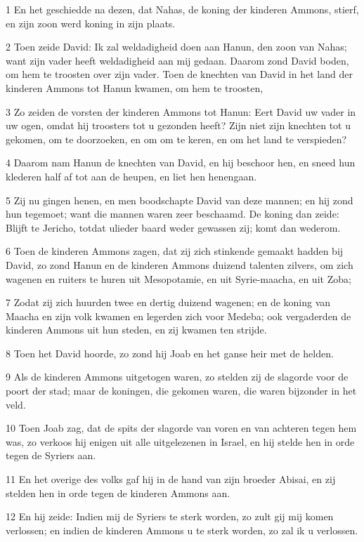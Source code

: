 \par 1 En het geschiedde na dezen, dat Nahas, de koning der kinderen Ammons, stierf, en zijn zoon werd koning in zijn plaats.
\par 2 Toen zeide David: Ik zal weldadigheid doen aan Hanun, den zoon van Nahas; want zijn vader heeft weldadigheid aan mij gedaan. Daarom zond David boden, om hem te troosten over zijn vader. Toen de knechten van David in het land der kinderen Ammons tot Hanun kwamen, om hem te troosten,
\par 3 Zo zeiden de vorsten der kinderen Ammons tot Hanun: Eert David uw vader in uw ogen, omdat hij troosters tot u gezonden heeft? Zijn niet zijn knechten tot u gekomen, om te doorzoeken, en om om te keren, en om het land te verspieden?
\par 4 Daarom nam Hanun de knechten van David, en hij beschoor hen, en sneed hun klederen half af tot aan de heupen, en liet hen henengaan.
\par 5 Zij nu gingen henen, en men boodschapte David van deze mannen; en hij zond hun tegemoet; want die mannen waren zeer beschaamd. De koning dan zeide: Blijft te Jericho, totdat ulieder baard weder gewassen zij; komt dan wederom.
\par 6 Toen de kinderen Ammons zagen, dat zij zich stinkende gemaakt hadden bij David, zo zond Hanun en de kinderen Ammons duizend talenten zilvers, om zich wagenen en ruiters te huren uit Mesopotamie, en uit Syrie-maacha, en uit Zoba;
\par 7 Zodat zij zich huurden twee en dertig duizend wagenen; en de koning van Maacha en zijn volk kwamen en legerden zich voor Medeba; ook vergaderden de kinderen Ammons uit hun steden, en zij kwamen ten strijde.
\par 8 Toen het David hoorde, zo zond hij Joab en het ganse heir met de helden.
\par 9 Als de kinderen Ammons uitgetogen waren, zo stelden zij de slagorde voor de poort der stad; maar de koningen, die gekomen waren, die waren bijzonder in het veld.
\par 10 Toen Joab zag, dat de spits der slagorde van voren en van achteren tegen hem was, zo verkoos hij enigen uit alle uitgelezenen in Israel, en hij stelde hen in orde tegen de Syriers aan.
\par 11 En het overige des volks gaf hij in de hand van zijn broeder Abisai, en zij stelden hen in orde tegen de kinderen Ammons aan.
\par 12 En hij zeide: Indien mij de Syriers te sterk worden, zo zult gij mij komen verlossen; en indien de kinderen Ammons u te sterk worden, zo zal ik u verlossen.

